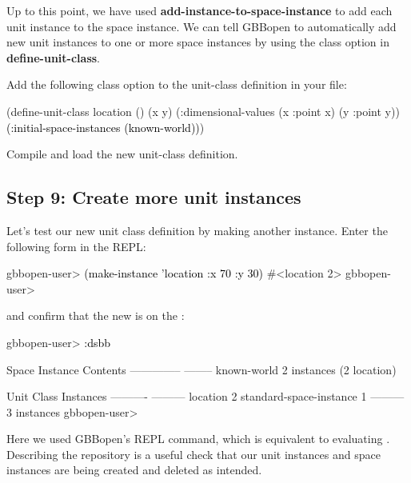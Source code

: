 \documentclass[10pt,twoside,english,pdftex]{article}
\begin{document}
Up to this point, we have used \textbf{add-instance-to-space-instance} to add
each  unit instance to the  space instance.
We can tell GBBopen to automatically add new unit instances to one or more
space instances by using the  class option in
\textbf{define-unit-class}.

%
%
Add the following  class option to the
 unit-class definition in your 
file:
%
\W\supp
\begin{example}
\textcolor{darkergray}{%
  (define-unit-class location ()
    (x y)
    (:dimensional-values
      (x :point x)
      (y :point y))
    \textcolor{black}{(:initial-space-instances (known-world))})}
\end{example}

Compile and load the new  unit-class definition.

\subsection*{Step 9: Create more  unit instances}

%
%
%
Let's test our new  unit class definition by making another
instance.  Enter the following form in the REPL:
%
\W\supp
\begin{example}
\textcolor{darkergray}{%
  gbbopen-user> \textcolor{black}{(make-instance 'location :x 70 :y 30)}
  #<location 2>
  gbbopen-user>}
\end{example}
%
%
%
and confirm that the new  is on the :
%
\W\supp\notpretop
\begin{example}
\textcolor{darkergray}{%
  gbbopen-user> \textcolor{black}{:dsbb}
  
  Space Instance                Contents
  --------------                --------
  known-world                   2 instances (2 location)

  Unit Class                    Instances
  ----------                    ---------
  location                              2
  standard-space-instance               1
                                ---------
                                        3 instances
  gbbopen-user>}
\end{example}
%
Here we used GBBopen's  REPL command, which is equivalent to
evaluating .  Describing the repository
is a useful check that our unit instances and space instances are being
created and deleted as intended.
\end{document}
